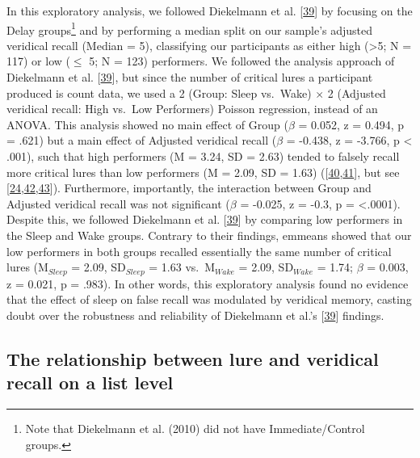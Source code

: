 \documentclass[
]{article}
\begin{document}
In this exploratory analysis, we followed Diekelmann et al. {[}\protect\hyperlink{ref-diekelmann2010a}{39}{]} by focusing on the Delay groups\footnote{Note that Diekelmann et al. (2010) did not have Immediate/Control groups.} and by performing a median split on our sample's adjusted veridical recall (Median = 5), classifying our participants as either high (\textgreater5; N = 117) or low (\(\leq\) 5; N = 123) performers. We followed the analysis approach of Diekelmann et al. {[}\protect\hyperlink{ref-diekelmann2010a}{39}{]}, but since the number of critical lures a participant produced is count data, we used a 2 (Group: Sleep vs.~Wake) \(\times\) 2 (Adjusted veridical recall: High vs.~Low Performers) Poisson regression, instead of an ANOVA. This analysis showed no main effect of Group (\(\beta\) = 0.052, z = 0.494, p = .621) but a main effect of Adjusted veridical recall (\(\beta\) = -0.438, z = -3.766, p \textless{} .001), such that high performers (M = 3.24, SD = 2.63) tended to falsely recall more critical lures than low performers (M = 2.09, SD = 1.63) ({[}\protect\hyperlink{ref-thapar2001a}{40},\protect\hyperlink{ref-toglia1999a}{41}{]}, but see {[}\protect\hyperlink{ref-roediger2001a}{24},\protect\hyperlink{ref-cann2011a}{42},\protect\hyperlink{ref-stadler1999a}{43}{]}). Furthermore, importantly, the interaction between Group and Adjusted veridical recall was not significant (\(\beta\) = -0.025, z = -0.3, p = \textless.0001). Despite this, we followed Diekelmann et al. {[}\protect\hyperlink{ref-diekelmann2010a}{39}{]} by comparing low performers in the Sleep and Wake groups. Contrary to their findings, emmeans showed that our low performers in both groups recalled essentially the same number of critical lures (M\(_{Sleep}\) = 2.09, SD\(_{Sleep}\) = 1.63 vs.~M\(_{Wake}\) = 2.09, SD\(_{Wake}\) = 1.74; \(\beta\) = 0.003, z = 0.021, p = .983). In other words, this exploratory analysis found no evidence that the effect of sleep on false recall was modulated by veridical memory, casting doubt over the robustness and reliability of Diekelmann et al.'s {[}\protect\hyperlink{ref-diekelmann2010a}{39}{]} findings.

\hypertarget{the-relationship-between-lure-and-veridical-recall-on-a-list-level}{%
\subsection{The relationship between lure and veridical recall on a list level}\label{the-relationship-between-lure-and-veridical-recall-on-a-list-level}}
\end{document}

